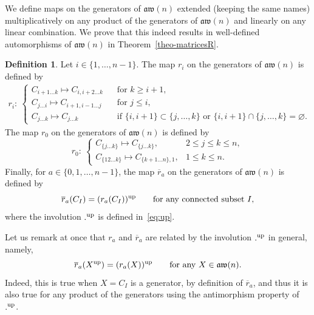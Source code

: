 \documentclass[10pt,a4paper]{amsart}
\numberwithin{equation}{section}
\theoremstyle{definition}
\newtheorem{defi}[theo]{Definition}
\newcommand{\rb}{\overline{r}}
\newcommand{\aw}{\mathfrak{aw}(n)}
\begin{document}
We define maps on the generators of $\aw$ extended (keeping the same names) multiplicatively on any product of the generators of $\aw$
and linearly on any linear combination. We prove that this indeed results in well-defined automorphisms of $\aw$ in Theorem~\ref{theo-matricesR}.
 \begin{defi}\label{def:rrb} Let $i\in\{1,\dots,n-1 \}$. The map $r_i$ on the generators of $\aw$ is defined by
\begin{gather}\label{def-rig}
r_i\colon \ \begin{cases}
C_{i+1\dots k} \mapsto C_{i,i+2\dots k} & \text{for }k\geq i+1 ,\\
C_{j \dots i} \mapsto C_{i+1,i-1\dots j} \quad & \text{for }j\leq i ,\\
 C_{j\dots k} \mapsto C_{j\dots k} & \text{if $\{i,i+1\}\subset \{j,\dots,k\}$ or $\{i,i+1\}\cap \{j,\dots,k\}=\varnothing$.}
\end{cases}
\end{gather}
The map $r_0$ on the generators of $\aw$ is defined by
\begin{equation*}%
r_0\colon \
\begin{cases}
C_{\{j\dots k\}}\mapsto C_{\{j\dots k\}} ,& 2\leq j\leq k\leq n , \\
C_{\{12\dots k\}}\mapsto C_{\{k+1\dots n\},1} ,& 1\leq k\leq n .
\end{cases}
\end{equation*}
Finally, for $a\in\{0,1,\dots,n-1\}$, the map $\rb_a$ on the generators of $\aw$ is defined by
\begin{equation*}%
 \rb_a(C_I)=(r_a(C_I))^{\rm up}\qquad \text{for any connected subset $I$,}
\end{equation*}
where the involution ${.}^{\rm up}$ is defined in~\eqref{eq:up}.
\end{defi}
Let us remark at once that $r_a$ and $\rb_a$ are related by the involution ${.}^{\rm up}$ in general, namely,
\begin{equation}\label{shifti}
 \rb_a(X^{\rm up})=(r_a(X))^{\rm up} \qquad \text{for any $X\in\aw$.}
\end{equation}
Indeed, this is true when $X=C_I$ is a generator, by definition of $\rb_a$, and thus it is also true for any product of the generators using the antimorphism property of ${.}^{\rm up}$.
\end{document}
